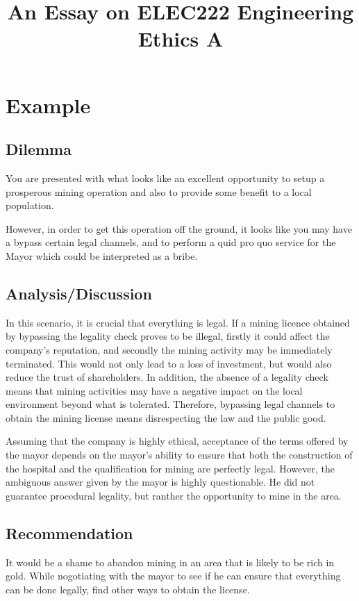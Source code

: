 \documentclass[12pt, a4paper]{article}
\title{An Essay on ELEC222 Engineering Ethics A}
\begin{document}
\maketitle
\tableofcontents

\section{Example \MakeUppercase{}}
\subsection*{Dilemma}
You are presented with what looks like an excellent opportunity to setup a prosperous mining operation and also to provide some benefit to a local population.

However, in order to get this operation off the ground, it looks like you may have a bypass certain legal channels, and to perform a quid pro quo service for the Mayor which could be interpreted as a bribe.

\subsection*{Analysis/Discussion}
In this scenario, it is crucial that everything is legal. If a mining licence obtained by bypassing the legality check proves to be illegal, firstly it could affect the company's reputation, and secondly the mining activity may be immediately terminated. This would not only lead to a loss of investment, but would also reduce the trust of shareholders. In addition, the absence of a legality check means that mining activities may have a negative impact on the local environment beyond what is tolerated. Therefore, bypassing legal channels to obtain the mining license means disrespecting the law and the public good.

Assuming that the company is highly ethical, acceptance of the terms offered by the mayor depends on the mayor's ability to ensure that both the construction of the hospital and the qualification for mining are perfectly legal. However, the ambiguous answer given by the mayor is highly questionable. He did not guarantee procedural legality, but ranther the opportunity to mine in the area.

\subsection*{Recommendation}
It would be a shame to abandon mining in an area that is likely to be rich in gold. While nogotiating with the mayor to see if he can ensure that everything can be done legally, find other ways to obtain the license.
\end{document}
